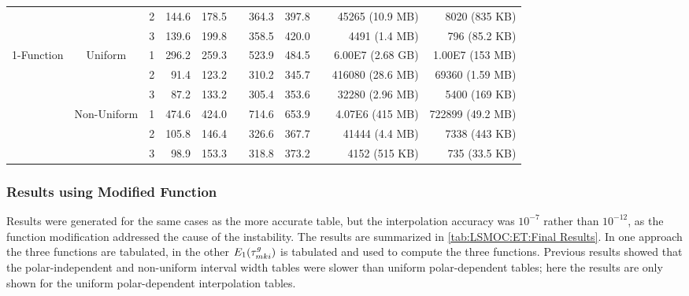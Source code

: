 {{{{\begin{table}
\begin{tabular}{@{}ccrrrrrrrrr@{}}
                                                                              && 2 & 144.6 & 178.5 && 364.3 & 397.8 && 45265  (10.9 MB) & 8020    (835 KB)\\\addlinespace[-0.2em]
                                                                              && 3 & 139.6 & 199.8 && 358.5 & 420.0 && 4491    (1.4 MB) & 796    (85.2 KB)\\\midrule
            \multirow{6}{*}{1-Function}       & \multirow{3}{*}{Uniform}       & 1 & 296.2 & 259.3 && 523.9 & 484.5 && 6.00E7 (2.68 GB) & 1.00E7  (153 MB)\\\addlinespace[-0.2em]
                                                                              && 2 &  91.4 & 123.2 && 310.2 & 345.7 && 416080 (28.6 MB) & 69360  (1.59 MB)\\\addlinespace[-0.2em]
                                                                              && 3 &  87.2 & 133.2 && 305.4 & 353.6 && 32280  (2.96 MB) & 5400    (169 KB)\\\cmidrule{2-11}\addlinespace[-0.2em]
                                                & \multirow{3}{*}{Non-Uniform} & 1 & 474.6 & 424.0 && 714.6 & 653.9 && 4.07E6  (415 MB) & 722899 (49.2 MB)\\\addlinespace[-0.2em]
                                                                              && 2 & 105.8 & 146.4 && 326.6 & 367.7 && 41444   (4.4 MB) & 7338   (443  KB)\\\addlinespace[-0.2em]
                                                                              && 3 &  98.9 & 153.3 && 318.8 & 373.2 && 4152    (515 KB) & 735    (33.5 KB)\\\bottomrule
          \end{tabular}
        \end{table}
      }
      \subsubsection{Results using Modified Function}{\label{sssec:LSMOC:ET:Results using Modified Function}
        Results were generated for the same cases as the more accurate table, but the interpolation accuracy was $10^{-7}$ rather than $10^{-12}$, as the function modification addressed the cause of the instability.
        The results are summarized in \cref{tab:LSMOC:ET:Final Results}.
        In one approach the three functions are tabulated, in the other $E_1(\segopt)$ is tabulated and used to compute the three functions.
        Previous results showed that the polar-independent and non-uniform interval width tables were slower than uniform polar-dependent tables; here the results are only shown for the uniform polar-dependent interpolation tables.

}}}}
